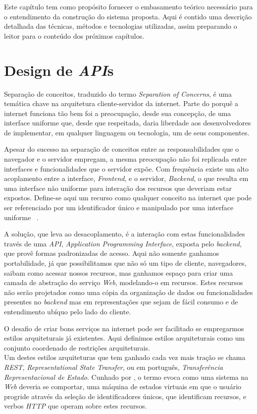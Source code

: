 Este capítulo tem como propósito fornecer o embasamento teórico necessário 
para o entendimento da construção do sistema proposta. Aqui é contido uma
descrição detalhada das técnicas, métodos e tecnologias utilizadas, assim  
preparando o leitor para o conteúdo dos próximos capítulos.


\section{Design de \emph{API}s}
Separação de conceitos, traduzido do termo \emph{Separation of Concerns}, é uma temática 
chave na arquitetura cliente-servidor da internet. Parte do porquê a internet funciona tão bem
foi a preocupação, desde sua concepção, de uma interface uniforme que, desde que respeitada, 
 daria liberdade aos desenvolvedores de implementar, em qualquer linguagem ou tecnologia,
 um de seus componentes. 

Apesar do sucesso na separação de conceitos entre as responsabilidades que o navegador 
e o servidor empregam, a mesma preocupação não foi replicada entre interfaces e 
funcionalidades que o servidor expõe. 
Com frequência existe um alto acoplamento entre a interface, \emph{Frontend},
e o servidor, \emph{Backend}, o que resulta em uma interface não uniforme para interação 
dos recursos que deveriam estar expostos. Define-se aqui um recurso como qualquer conceito 
na internet que pode ser referenciado por um identificador único e manipulado por uma interface uniforme 
\ \cite{masse2011rest}.

A solução, que leva ao desacoplamento, é a interação com estas
funcionalidades través de uma \emph{API}, \emph{Application Programming Interface},
exposta pelo \emph{backend}, que provê formas padronizadas 
de acesso. Aqui não somente ganhamos portabilidade, já que possibilitamos que não só 
um tipo de cliente, navegadores, saibam como acessar nossos recursos, mas ganhamos espaço 
para criar uma camada de abstração do serviço \emph{Web}, modelando-o em recursos.
Estes recursos não serão projetados como uma cópia da organização de dados ou funcionalidades 
presentes no \emph{backend} mas em representações que sejam de fácil consumo e de entendimento 
ubíquo pelo lado do cliente.

O desafio de criar bons serviços na internet pode ser facilitado se empregarmos estilos 
arquiteturais já existentes. Aqui definimos estilos arquiteturais como 
um conjunto coordenado de restrições arquiteturais. \\
Um destes estilos arquiteturas que tem ganhado cada vez 
mais tração se chama \emph{REST}, \emph{Representational State Transfer}, ou em português,
\emph{Transferência Representacional de Estado}. Cunhado por , 
o termo evoca como uma sistema na \emph{Web} deveria se comportar, uma máquina de estados 
virtuais em que o usuário progride através da seleção de identificadores únicos, que identificam 
recursos, e verbos \emph{HTTP}
que operam sobre estes recursos.

